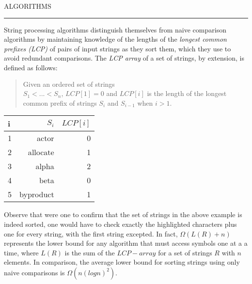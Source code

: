 
\sffamily\normalsize{\color{sciorange}ALGORITHMS}\small\\
\rule[3mm]{190mm}{0.1pt}\vspace{-8mm}
\begin{multicols}{3}
\footnotesize
String processing algorithms distinguish themselves from naive comparison
algorithms by maintaining knowledge of the lengths of the {\em longest common
prefixes (LCP)} of pairs of input strings as they sort them, which they use to
avoid redundant comparisons.  The {\em LCP array} of a set of strings, by
extension, is defined as follows:

\begin{quote}
    Given an ordered set of strings\\ $S_1 < ... < S_n$,
    $LCP[1] = 0$ and $LCP[i]$ is the length of the longest common prefix of
    strings $S_i$ and $S_{i-1}$ when $i > 1$.
\end{quote}

\begin{center}
\begin{tabular}{lrr}
    i&  $S_i$&          $LCP[i]$\\ \hline
    1&  actor&        0\\
    2&  {\color{red}a}llocate&   1\\
    3&  {\color{red}al}pha&      2\\
    4&  beta&         0\\
    5&  {\color{red}b}yproduct&  1\\
\end{tabular}
\end{center}

Observe that were one to confirm that the set of strings in the above example
is indeed sorted, one would have to check exactly the highlighted characters
plus one for every string, with the first string excepted.
In fact, $\Omega(L(R) + n)$ represents the lower bound for any algorithm that must
access symbols one at a a time, where $L(R)$ is the sum of the $LCP-array$ for
a set of strings $R$ with $n$ elements.  In comparison, the
average lower bound for sorting strings using only naive comparisons is
$\Omega(n(log n)^2)$.
\end{multicols}%

